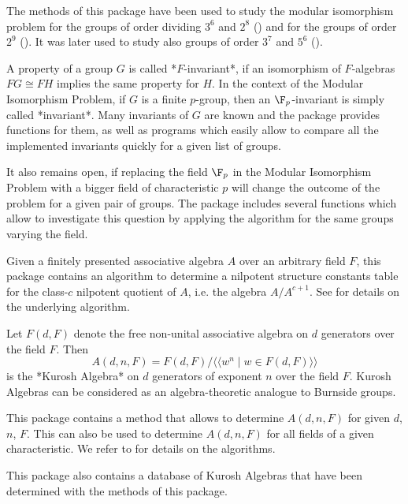 The methods of this package have been used to study the modular isomorphism
problem for the groups of order dividing $3^6$ and $2^8$ (\cite{Eic07}) and
for the groups of order $2^9$ (\cite{EKo11}). It was later used to study also 
groups of order $3^7$ and $5^6$ (\cite{MM22}).
\medskip

A property of a group $G$ is called *$F$-invariant*, if an isomorphism of
$F$-algebras $FG \cong FH$ implies the same property for $H$. In the context
of the Modular Isomorphism Problem, if $G$ is a finite $p$-group, then an 
$\F_p$-invariant is simply called 
*invariant*. Many invariants of $G$ are known and the package provides
functions for them, as well as programs which easily allow to compare all
the implemented invariants quickly for a given list of groups.
\medskip

It also remains open, if replacing the field $\F_p$ in the Modular Isomorphism
Problem with a bigger field of characteristic $p$ will change the outcome
of the problem for a given pair of groups. The package includes several 
functions which allow to investigate this question by applying the algorithm
for the same groups varying the field.


Given a finitely presented associative algebra $A$ over an arbitrary
field $F$, this package contains an algorithm to determine a nilpotent
structure constants table for the class-$c$ nilpotent quotient of $A$,
i.e. the algebra $A/A^{c+1}$. 
See \cite{Eic11} for details on the underlying algorithm.


Let $F(d,F)$ denote the free non-unital associative algebra on $d$ 
generators over the field $F$. Then 
$$A(d,n,F) = F(d,F) / \langle \langle w^n \mid w \in F(d,F) \rangle \rangle$$
is the *Kurosh Algebra* on $d$ generators of exponent $n$ over the field
$F$. Kurosh Algebras can be considered as an algebra-theoretic analogue to 
Burnside groups. 

This package contains a method that allows to determine $A(d,n,F)$ for
given $d$, $n$, $F$. This can also be used to determine $A(d,n,F)$ for all
fields of a given characteristic. We refer to \cite{Eic11} for details on
the algorithms.

This package also contains a database of Kurosh Algebras that have been
determined with the methods of this package. 

